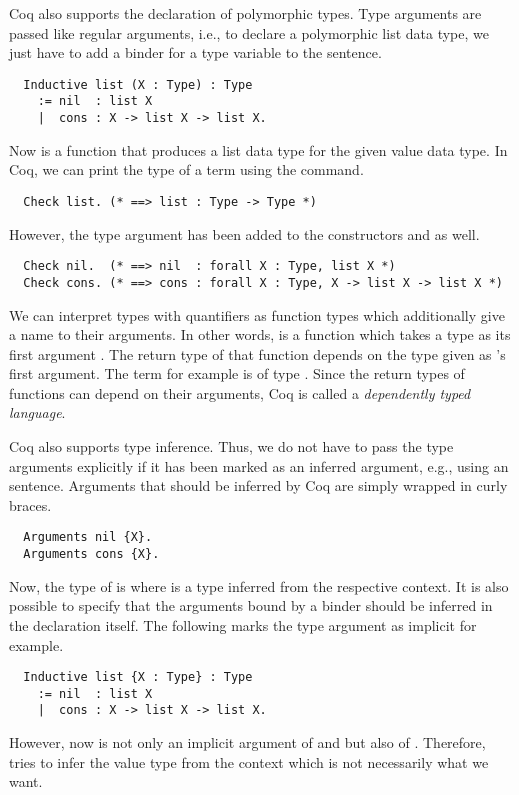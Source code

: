 Coq also supports the declaration of polymorphic types.
Type arguments are passed like regular arguments, i.e., to declare a polymorphic list data type, we just have to add a binder for a type variable to the  sentence.
\begin{verbatim}
  Inductive list (X : Type) : Type
    := nil  : list X
    |  cons : X -> list X -> list X.
\end{verbatim}
Now  is a function that produces a list data type for the given value data type.
In Coq, we can print the type of a term using the  command.
\begin{verbatim}
  Check list. (* ==> list : Type -> Type *)
\end{verbatim}
However, the type argument  has been added to the constructors  and  as well.
\begin{verbatim}
  Check nil.  (* ==> nil  : forall X : Type, list X *)
  Check cons. (* ==> cons : forall X : Type, X -> list X -> list X *)
\end{verbatim}
We can interpret types with  quantifiers as function types which additionally give a name to their arguments.
In other words,  is a function which takes a type as its first argument .
The return type of that function depends on the type given as 's first argument.
The term  for example is of type .
Since the return types of functions can depend on their arguments, Coq is called a \textit{dependently typed language}.

Coq also supports type inference.
Thus, we do not have to pass the type arguments explicitly if it has been marked as an inferred argument, e.g., using an  sentence.
Arguments that should be inferred by Coq are simply wrapped in curly braces.
\begin{verbatim}
  Arguments nil {X}.
  Arguments cons {X}.
\end{verbatim}
Now, the type of  is  where  is a type inferred from the respective context.
It is also possible to specify that the arguments bound by a binder should be inferred in the declaration itself.
The following marks the type argument  as implicit for example.
\begin{verbatim}
  Inductive list {X : Type} : Type
    := nil  : list X
    |  cons : X -> list X -> list X.
\end{verbatim}
However, now  is not only an implicit argument of  and  but also of .
Therefore,  tries to infer the value type from the context which is not necessarily what we want.

